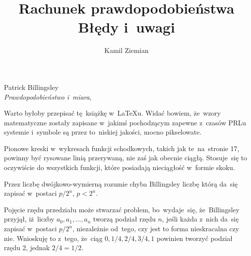 \documentclass[a4paper,11pt]{article}
\title{Rachunek prawdopodobieństwa \\
  {\Large Błędy i~uwagi}}
\author{Kamil Ziemian}
\numberwithin{equation}{section}
\begin{document}





\maketitle %





{ %
  Patrick Billingsley \\
  \textit{Prawdopodobieństwo i~miara},
  \cite{BillingsleyPrawdopodobienstwoIMiara2009}}

\vspace{0em}



\vspace{0em}


\noindent
Warto byłoby przepisać tę~książkę w~\LaTeX u. Widać bowiem,
że~wzory matematyczne zostały zapisane w~jakimś pochodzącym zapewne
z~czasów PRLu systemie i~symbole są przez to~niskiej jakości, mocno
pikselowate.

\VerSpaceFour





\noindent
Pionowe kreski w~wykresach funkcji schodkowych, takich jak
te~na~stronie 17, powinny być rysowane linią przerywaną, nie zaś jak
obecnie ciągłą. Stosuje~się to oczywiście do wszystkich funkcji, które
posiadają nieciągłość w~formie skoku.

\VerSpaceFour







\noindent
{} Przez liczbę dwójkowo-wymierną rozumie chyba Billingsley liczbę
którą da~się zapisać w~postaci $p / 2^{ n }$, $p < 2^{ n }$.

\VerSpaceFour





\noindent
{} Pojęcie rzędu przedziału może stwarzać problem, bo~wydaje~się,
że~Billingsley przyjął, iż~liczby $a_{ 0 }, a_{ 1 }, \ldots, a_{ n }$ tworzą
podział rzędu $n$, jeśli każda z~nich da~się zapisać w~postaci
$p / 2^{ n }$, niezależnie od~tego, czy jest to forma nieskracalna czy nie.
Wnioskuję to z~tego, że~ciąg $0, 1/4, 2/4, 3/4, 1$ powinien tworzyć podział
rzędu 2, jednak $2/4 = 1/2$.
\end{document}
